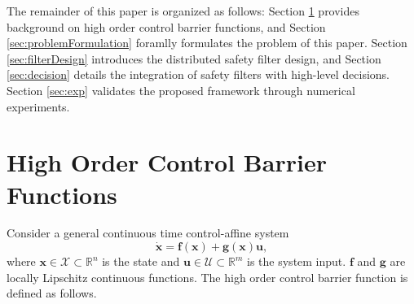 \documentclass{ifacconf}
\begin{document}
\par The remainder of this paper is organized as follows: Section \ref{sec:preliminariy} provides background on high order control barrier functions, and Section \ref{sec:problemFormulation} foramlly formulates the problem of this paper.
Section \ref{sec:filterDesign} introduces the distributed safety filter design, and Section \ref{sec:decision} details the integration of safety filters with high-level decisions.
Section \ref{sec:exp} validates the proposed framework through numerical experiments.


\section{High Order Control Barrier Functions}\label{sec:preliminariy}
Consider a general continuous time control-affine system
\begin{equation} \label{eqn:system}
  \dot{\boldsymbol{x}} = \boldsymbol{f}(\boldsymbol{x}) + \boldsymbol{g}(\boldsymbol{x}) \boldsymbol{u} ,
\end{equation}
where $\boldsymbol{x} \in \mathcal{X} \subset \mathbb{R}^n$ is the state and $\boldsymbol{u} \in \mathcal{U} \subset \mathbb{R}^m$ is the system input. $\boldsymbol{f}$ and $\boldsymbol{g}$ are locally Lipschitz continuous functions. The high order control barrier function is defined as follows.
\end{document}
